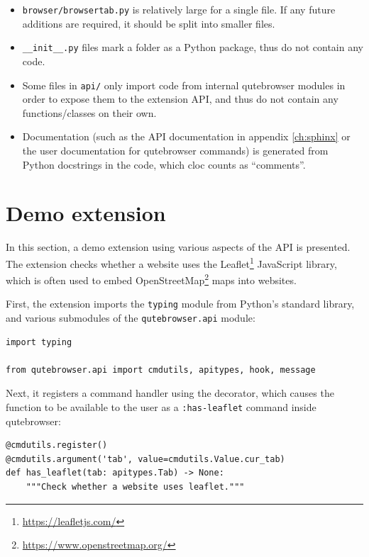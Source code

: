 \begin{itemize}[parsep=5pt]

  \item \verb|browser/browsertab.py| is relatively large for a single file.
    If any future additions are required, it should be split into smaller
    files.
  \item \verb|__init__.py| files mark a folder as a Python package, thus
    do not contain any code.
  \item Some files in \verb|api/| only import code from internal
    qutebrowser modules in order to expose them to the extension API, and thus
    do not contain any functions/classes on their own.
  \item Documentation (such as the API documentation in appendix \ref{ch:sphinx}
    or the user documentation for qutebrowser commands) is generated from
    Python docstrings in the code, which cloc counts as ``comments''.
\end{itemize}

\section{Demo extension}
In this section, a demo extension using various aspects of the API is
presented. The extension checks whether a website uses the
Leaflet\footnote{\url{https://leafletjs.com/}} JavaScript library, which is
often used to embed OpenStreetMap\footnote{\url{https://www.openstreetmap.org/}}
maps into websites.

First, the extension imports the \verb|typing| module from Python's standard
library, and various submodules of the \verb|qutebrowser.api| module:

\begin{verbatim}
import typing

from qutebrowser.api import cmdutils, apitypes, hook, message
\end{verbatim}

Next, it registers a command handler using the 
decorator, which causes the function to be available to the user as a
\verb|:has-leaflet| command inside qutebrowser:

\begin{verbatim}
@cmdutils.register()
@cmdutils.argument('tab', value=cmdutils.Value.cur_tab)
def has_leaflet(tab: apitypes.Tab) -> None:
    """Check whether a website uses leaflet."""
\end{verbatim}

